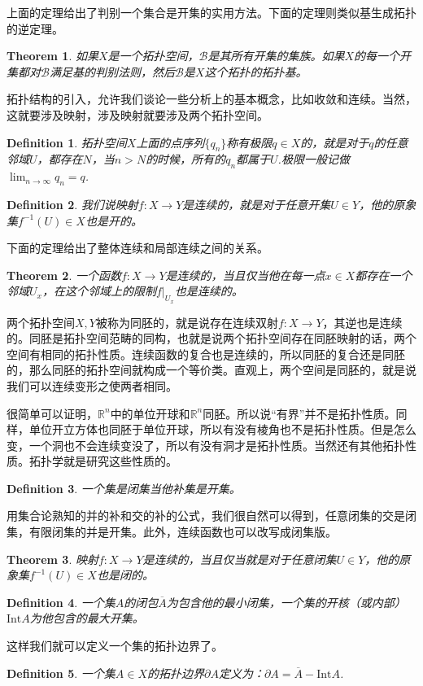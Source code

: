 \documentclass[10pt]{book}
\theoremstyle{plain}%
\newtheorem{theo}{Theorem}%
\newtheorem{defi}{Definition}%
\begin{document}
上面的定理给出了判别一个集合是开集的实用方法。下面的定理则类似基生成拓扑的逆定理。
\begin{theo}
如果$X$是一个拓扑空间，$\mathcal{B}$是其所有开集的集族。如果$X$的每一个开集都对$\mathcal{B}$满足基的判别法则，然后$\mathcal{B}$是$X$这个拓扑的拓扑基。
\end{theo}

拓扑结构的引入，允许我们谈论一些分析上的基本概念，比如收敛和连续。当然，这就要涉及映射，涉及映射就要涉及两个拓扑空间。

\begin{defi}
拓扑空间$X$上面的点序列$\{q_n\}$称有极限$q \in X$的，就是对于$q$的任意邻域$U$，都存在$N$，当$n>N$的时候，所有的$q_n$都属于$U$.极限一般记做$\lim_{n\to \infty} q_n=q$.
\end{defi}

\begin{defi}
我们说映射$f:X\to Y$是连续的，就是对于任意开集$U \in Y$，他的原象集$f^{-1}(U) \in X$也是开的。
\end{defi}
下面的定理给出了整体连续和局部连续之间的关系。

\begin{theo}
一个函数$f:X\to Y$是连续的，当且仅当他在每一点$x \in X$都存在一个邻域$U_x$，在这个邻域上的限制$f|_{U_x}$也是连续的。
\end{theo}

两个拓扑空间$X,Y$被称为同胚的，就是说存在连续双射$f:X\to Y$，其逆也是连续的。同胚是拓扑空间范畴的同构，也就是说两个拓扑空间存在同胚映射的话，两个空间有相同的拓扑性质。连续函数的复合也是连续的，所以同胚的复合还是同胚的，那么同胚的拓扑空间就构成一个等价类。直观上，两个空间是同胚的，就是说我们可以连续变形之使两者相同。

很简单可以证明，$\mathbb{R}^n$中的单位开球和$\mathbb{R}^n$同胚。所以说“有界”并不是拓扑性质。同样，单位开立方体也同胚于单位开球，所以有没有棱角也不是拓扑性质。但是怎么变，一个洞也不会连续变没了，所以有没有洞才是拓扑性质。当然还有其他拓扑性质。拓扑学就是研究这些性质的。   

\begin{defi}
一个集是闭集当他补集是开集。
\end{defi}
用集合论熟知的并的补和交的补的公式，我们很自然可以得到，任意闭集的交是闭集，有限闭集的并是开集。此外，连续函数也可以改写成闭集版。
\begin{theo}
映射$f:X\to Y$是连续的，当且仅当就是对于任意闭集$U \in Y$，他的原象集$f^{-1}(U) \in X$也是闭的。
\end{theo}
\begin{defi}
一个集$A$的闭包$\overline{A}$为包含他的最小闭集，一个集的开核（或内部）$\mathrm{Int} A$为他包含的最大开集。
\end{defi}
这样我们就可以定义一个集的拓扑边界了。
\begin{defi}
一个集$A \in X$的拓扑边界$\partial A$定义为：$\partial A=\overline{A}-\mathrm{Int} A$.
\end{defi}
\end{document}
